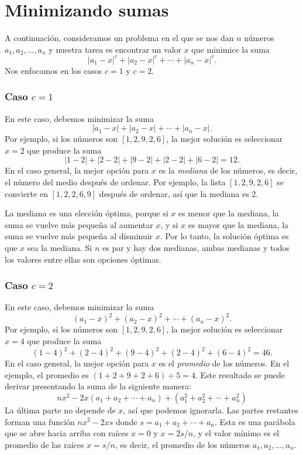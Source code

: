 \section{Minimizando sumas}

A continuación, consideramos un problema en el que
se nos dan $n$ números $a_1,a_2,\ldots,a_n$
y nuestra tarea es encontrar un valor $x$
que minimice la suma
\[|a_1-x|^c+|a_2-x|^c+\cdots+|a_n-x|^c.\]
Nos enfocamos en los casos $c=1$ y $c=2$.

\subsubsection{Caso $c=1$}

En este caso, debemos minimizar la suma
\[|a_1-x|+|a_2-x|+\cdots+|a_n-x|.\]
Por ejemplo, si los números son $[1,2,9,2,6]$,
la mejor solución es seleccionar $x=2$
que produce la suma
\[
    |1-2|+|2-2|+|9-2|+|2-2|+|6-2|=12.
\]
En el caso general, la mejor opción para $x$
es la \textit{mediana} de los números,
es decir, el número del medio después de ordenar.
Por ejemplo, la lista $[1,2,9,2,6]$
se convierte en $[1,2,2,6,9]$ después de ordenar,
así que la mediana es 2.

La mediana es una elección óptima,
porque si $x$ es menor que la mediana,
la suma se vuelve más pequeña al aumentar $x$,
y si $x$ es mayor que la mediana,
la suma se vuelve más pequeña al disminuir $x$.
Por lo tanto, la solución óptima es que $x$
sea la mediana.
Si $n$ es par y hay dos medianas,
ambas medianas y todos los valores entre ellas
son opciones óptimas.

\subsubsection{Caso $c=2$}

En este caso, debemos minimizar la suma
\[(a_1-x)^2+(a_2-x)^2+\cdots+(a_n-x)^2.\]
Por ejemplo, si los números son $[1,2,9,2,6]$,
la mejor solución es seleccionar $x=4$
que produce la suma
\[
    (1-4)^2+(2-4)^2+(9-4)^2+(2-4)^2+(6-4)^2=46.
\]
En el caso general, la mejor opción para $x$
es el \emph{promedio} de los números.
En el ejemplo, el promedio es $(1+2+9+2+6)\div5=4$.
Este resultado se puede derivar presentando
la suma de la siguiente manera:
\[
    nx^2 - 2x(a_1+a_2+\cdots+a_n) + (a_1^2+a_2^2+\cdots+a_n^2)
\]
La última parte no depende de $x$,
así que podemos ignorarla.
Las partes restantes forman una función
$nx^2-2xs$ donde $s=a_1+a_2+\cdots+a_n$.
Esta es una parábola que se abre hacia arriba
con raíces $x=0$ y $x=2s/n$,
y el valor mínimo es el promedio
de las raíces $x=s/n$, es decir,
el promedio de los números $a_1,a_2,\ldots,a_n$.

